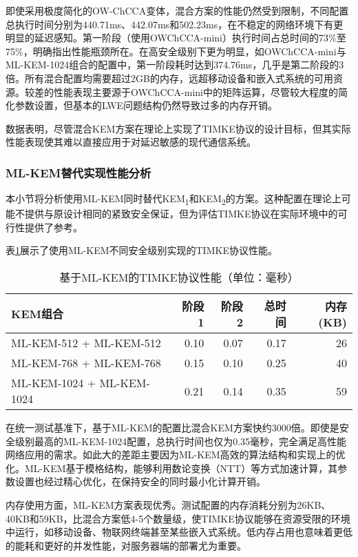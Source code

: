 即使采用极度简化的OW-ChCCA变体，混合方案的性能仍然受到限制，不同配置总执行时间分别为440.71ms、442.07ms和502.23ms，在不稳定的网络环境下有更明显的延迟感知。第一阶段（使用OWChCCA-mini）执行时间占总时间的73\%至75\%，明确指出性能瓶颈所在。在高安全级别下更为明显，如OWChCCA-mini与ML-KEM-1024组合的配置中，第一阶段耗时达到374.76ms，几乎是第二阶段的3倍。所有混合配置均需要超过2GB的内存，远超移动设备和嵌入式系统的可用资源。较差的性能表现主要源于OWChCCA-mini中的矩阵运算，尽管较大程度的简化参数设置，但基本的LWE问题结构仍然导致过多的内存开销。

数据表明，尽管混合KEM方案在理论上实现了TIMKE协议的设计目标，但其实际性能表现使其难以直接应用于对延迟敏感的现代通信系统。

\subsubsection{ML-KEM替代实现性能分析}

本小节将分析使用ML-KEM同时替代KEM\textsubscript{1}和KEM\textsubscript{2}的方案。这种配置在理论上可能不提供与原设计相同的紧致安全保证，但为评估TIMKE协议在实际环境中的可行性提供了参考。

表\ref{tab:timke-mlkem-perf}展示了使用ML-KEM不同安全级别实现的TIMKE协议性能。

\begin{table}[ht]
\centering
\caption{基于ML-KEM的TIMKE协议性能（单位：毫秒）}
\label{tab:timke-mlkem-perf}
\begin{tabular}{|l|r|r|r|r|}
\hline
\textbf{KEM组合} & \textbf{阶段1} & \textbf{阶段2} & \textbf{总时间} & \textbf{内存(KB)} \\
\hline
ML-KEM-512 + ML-KEM-512    & 0.10  & 0.07  & 0.17  & 26   \\
\hline
ML-KEM-768 + ML-KEM-768    & 0.15  & 0.10  & 0.25  & 40   \\
\hline
ML-KEM-1024 + ML-KEM-1024  & 0.21  & 0.14  & 0.35  & 59   \\
\hline
\end{tabular}
\end{table}

在统一测试基准下，基于ML-KEM的配置比混合KEM方案快约3000倍。即使是安全级别最高的ML-KEM-1024配置，总执行时间也仅为0.35毫秒，完全满足高性能网络应用的需求。如此大的差距主要因为ML-KEM高效的算法结构和实现上的优化。ML-KEM基于模格结构，能够利用数论变换（NTT）等方式加速计算，其参数设置也经过精心优化，在保持安全的同时最小化计算开销。

内存使用方面，ML-KEM方案表现优秀。测试配置的内存消耗分别为26KB、40KB和59KB，比混合方案低4-5个数量级，使TIMKE协议能够在资源受限的环境中运行，如移动设备、物联网终端甚至某些嵌入式系统。低内存占用也意味着更低的能耗和更好的并发性能，对服务器端的部署尤为重要。

